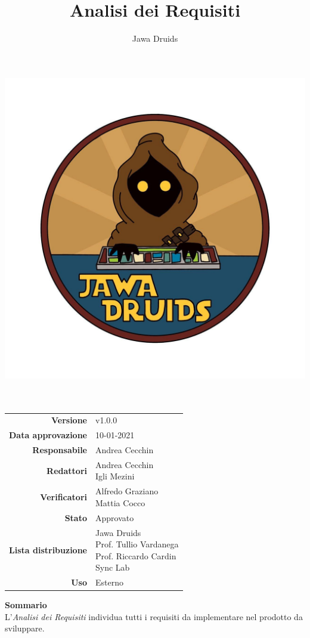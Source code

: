 



\makeatletter
\begin{titlepage}
	\begin{center}
		\vspace*{-4,0cm}
		\author{Jawa Druids}
		\title{Analisi dei Requisiti}
		\date{} %
		\includegraphics[width=0.5\linewidth]{../immagini/DRUIDSLOGO.jpg}\\[4ex]
		{\huge \bfseries  \@title }\\[2ex]
		{\LARGE  \@author}\\[50ex]
		\vspace*{-9,0cm}
		\begin{table}[H]
			\renewcommand{\arraystretch}{1.4}
			\centering
			\begin{tabular}{r | l}
				\textbf{Versione} & v1.0.0 \\%
				\textbf{Data approvazione} & 10-01-2021\\
				\textbf{Responsabile} & Andrea Cecchin\\
				\textbf{Redattori} & \makecell[tl]{Andrea Cecchin \\ Igli Mezini} \\
				\textbf{Verificatori} & \makecell[tl]{Alfredo Graziano \\ Mattia Cocco } \\
				\textbf{Stato} & Approvato\\
				\textbf{Lista distribuzione} & \makecell[tl]{Jawa Druids \\ Prof. Tullio Vardanega \\ Prof. Riccardo Cardin \\ Sync Lab}\\
				\textbf{Uso} & Esterno
			\end{tabular}
		\end{table}
		\vspace{0.2cm}
		\hfill \break
		\fontsize{17}{10}\textbf{Sommario} \\
		\vspace{0.3cm}
		L'\emph{\normalsize Analisi dei Requisiti} individua tutti i requisiti da implementare nel prodotto da sviluppare.
	\end{center}
\end{titlepage}
\makeatother

